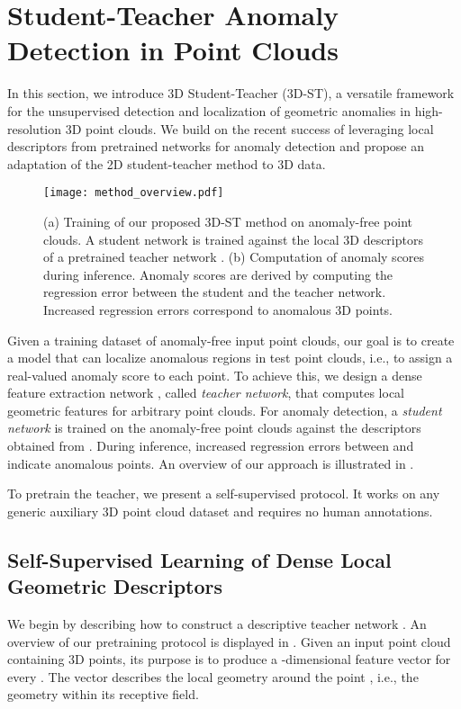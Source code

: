 \documentclass[twoside,11pt]{article}
\newcommand{\methodname}{{3D-ST}}
\begin{document}
\section{Student-Teacher Anomaly Detection in Point Clouds}

In this section, we introduce 3D Student-Teacher (\methodname{}), a versatile framework for the unsupervised detection and localization of geometric anomalies in high-resolution 3D point clouds. We build on the recent success of leveraging local descriptors from pretrained networks for anomaly detection and propose an adaptation of the 2D student-teacher method \citep{bergmann2020uninformed} to 3D data.

\begin{figure}[t]
    \centering
\texttt{[image: method\_overview.pdf]}
    \caption{(a) Training of our proposed \methodname{} method on anomaly-free point clouds. A student network  is trained against the local 3D descriptors of a pretrained teacher network . (b) Computation of anomaly scores during inference. Anomaly scores are derived by computing the regression error between the student and the teacher network. Increased regression errors correspond to anomalous 3D points.}
    \label{fig:ad_method_overview}
\end{figure}

Given a training dataset of anomaly-free input point clouds, our goal is to create a model that can localize anomalous regions in test point clouds, i.e., to assign a real-valued anomaly score to each point. To achieve this, we design a dense feature extraction network , called \textit{teacher network}, that computes local geometric features for arbitrary point clouds. For anomaly detection, a \textit{student network}  is trained on the anomaly-free point clouds against the descriptors obtained from . During inference, increased regression errors between  and  indicate anomalous points. An overview of our approach is illustrated in .

To pretrain the teacher, we present a self-supervised protocol. It works on any generic auxiliary 3D point cloud dataset and requires no human annotations. 


\subsection{Self-Supervised Learning of Dense Local Geometric Descriptors}
\label{sec:teacher_pretraining}
We begin by describing how to construct a descriptive teacher network . An overview of our pretraining protocol is displayed in . Given an input point cloud  containing  3D points, its purpose is to produce a -dimensional feature vector  for every .
The vector  describes the local geometry around the point , i.e., the geometry within its receptive field. 
\end{document}
